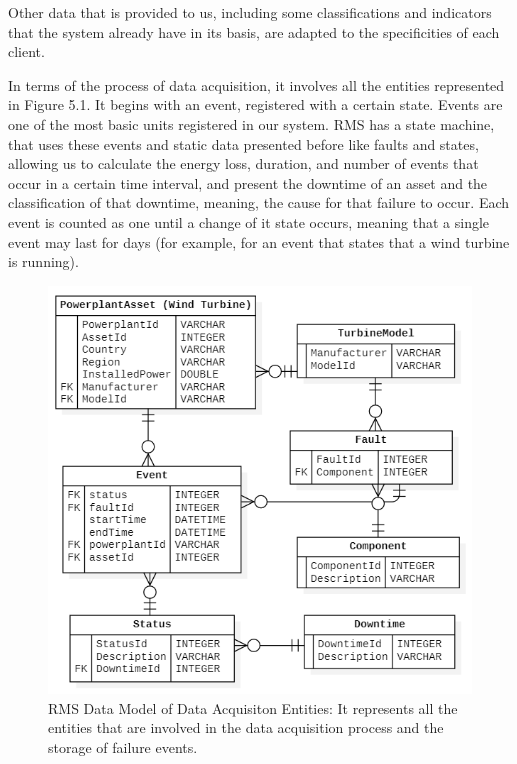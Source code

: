 Other data that is provided to us, including some classifications and indicators that the system already have in its basis, are adapted to the specificities of each client.

In terms of the process of data acquisition, it involves all the entities represented in Figure 5.1. It begins with an event, registered with a certain state. Events are one of the most basic units registered in our system. RMS has a state machine, that uses these events and static data presented before like faults and states, allowing us to calculate the energy loss, duration, and number of events that occur in a certain time interval, and present the downtime of an asset and the classification of that downtime, meaning, the cause for that failure to occur. Each event is counted as one until a change of it state occurs, meaning that a single event may last for days (for example, for an event that states that a wind turbine is running).

\begin{figure}[htbp]
	\centering
	\includegraphics[scale=0.7]{Chapters/Figures/methodology_fig10.png}
	\caption{RMS Data Model of Data Acquisiton Entities: It represents all the entities that are involved in the data acquisition process and the storage of failure events.}
	\label{fig:Figuras_Tree_silhouettes-vectorial}
\end{figure}

